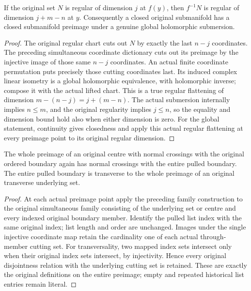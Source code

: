 \begin{theorem}
\label{hir:submersion-relative-regular-geometry}
If the original set $N$ is regular of dimension $j$ at $f(y)$,
then $f^{-1}N$ is regular of dimension $j+m-n$ at $y$.
Consequently a closed original submanifold has a closed submanifold
preimage under a genuine global holomorphic submersion.
\end{theorem}
\begin{proof}
The original regular chart cuts out $N$ by exactly the last $n-j$
coordinates. The preceding simultaneous coordinate dictionary cuts out
its preimage by the injective image of those same $n-j$ coordinates.
An actual finite coordinate permutation puts precisely those cutting
coordinates last. Its induced complex linear isometry is a global
holomorphic equivalence, with holomorphic inverse; compose it with the
actual lifted chart. This is a true regular flattening of dimension
$m-(n-j)=j+(m-n)$. The actual submersion internally implies $n\le m$,
and the original regularity implies $j\le n$, so the equality and dimension
bound hold also when either dimension is zero. For the global statement,
continuity gives closedness and apply this actual regular flattening
at every preimage point to its original regular dimension.
\end{proof}
\leanok

\begin{theorem}
\label{hir:submersion-relative-nc-transversality}
The whole preimage of an original centre with normal crossings with
the original ordered boundary again has normal crossings with the
entire pulled boundary. The entire pulled boundary is transverse
to the whole preimage of an original transverse underlying set.
\end{theorem}
\begin{proof}
At each actual preimage point apply the preceding family construction
to the original simultaneous family consisting of the underlying set
or centre and every indexed original boundary member. Identify the
pulled list index with the same original index; list length and order
are unchanged. Images under the single injective coordinate map retain
the cardinality one of each actual through-member cutting set.
For transversality, two mapped index sets intersect only when their
original index sets intersect, by injectivity. Hence every original
disjointness relation with the underlying cutting set is retained.
These are exactly the original definitions on the entire preimage;
empty and repeated historical list entries remain literal.
\end{proof}
\leanok

